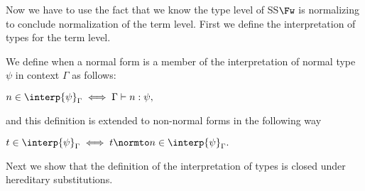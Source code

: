 Now we have to use the fact that we know the type level of SS$\Fw$ is
normalizing to conclude normalization of the term level.  First we
define the interpretation of types for the term level.

\begin{definition}
  \label{def:interpretation_of_types_stlc}
  We define when a normal form is a member of the interpretation of
  normal type $\psi$ in context $\Gamma$ as follows:
  \begin{center}
    \begin{math}
    n \in \interp{\psi}_\Gamma \iff \Gamma \vdash n:\psi,
  \end{math}
  \end{center}
  and this definition is extended to non-normal forms in the following way
  \begin{center}
    \begin{math}
      t \in \interp{\psi}_\Gamma \iff t \normto n \in \interp{\psi}_\Gamma.
  \end{math}
  \end{center}
\end{definition}

\noindent 
Next we show that the definition of the interpretation of types is closed under
hereditary substitutions.  


